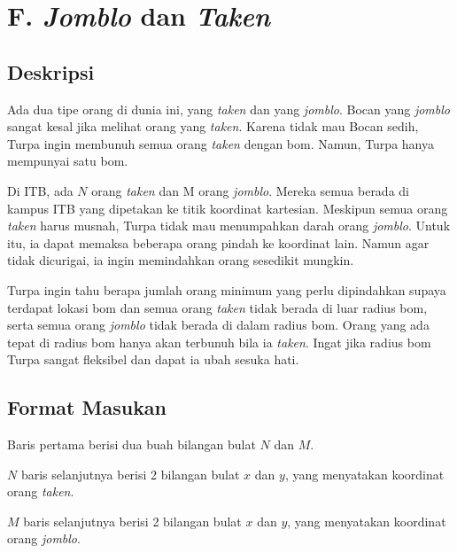 \documentclass{article}
\begin{document}
\section*{\hfil F. \textit{Jomblo} dan \textit{Taken}\hfil}


\subsection*{Deskripsi}

\par\noindent Ada dua tipe orang di dunia ini, yang \textit{taken} dan yang \textit{jomblo}. Bocan yang \textit{jomblo} sangat kesal jika melihat orang yang \textit{taken}. Karena tidak mau Bocan sedih, Turpa ingin membunuh semua orang \textit{taken} dengan bom. Namun, Turpa hanya mempunyai satu bom.

\par\noindent Di ITB, ada $N$ orang \textit{taken} dan M orang \textit{jomblo}. Mereka semua berada di kampus ITB yang dipetakan ke titik koordinat kartesian. Meskipun semua orang \textit{taken} harus musnah, Turpa tidak mau menumpahkan darah orang \textit{jomblo}. Untuk itu, ia dapat memaksa beberapa orang pindah ke koordinat lain. Namun agar tidak dicurigai, ia ingin memindahkan orang sesedikit mungkin.

\par\noindent Turpa ingin tahu berapa jumlah orang minimum yang perlu dipindahkan supaya terdapat lokasi bom dan semua orang \textit{taken} tidak berada di luar radius bom, serta semua orang \textit{jomblo} tidak berada di dalam radius bom. Orang yang ada tepat di radius bom hanya akan terbunuh bila ia \textit{taken}. Ingat jika radius bom Turpa sangat fleksibel dan dapat ia ubah sesuka hati.

\subsection*{Format Masukan}

\par\noindent Baris pertama berisi dua buah bilangan bulat $N$ dan $M$.
\par\noindent $N$ baris selanjutnya berisi 2 bilangan bulat $x$ dan $y$, yang menyatakan koordinat orang \textit{taken}.
\par\noindent $M$ baris selanjutnya berisi 2 bilangan bulat $x$ dan $y$, yang menyatakan koordinat orang \textit{jomblo}.
\end{document}
